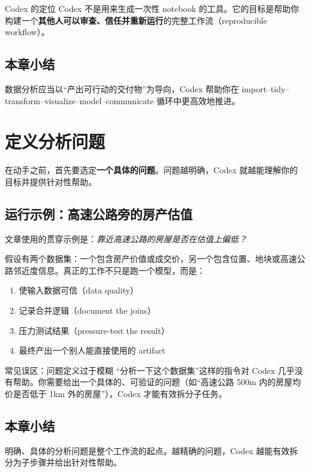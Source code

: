 \documentclass[a4paper]{article}
\begin{document}
\begin{importantbox}{Codex 的定位}
Codex 不是用来生成一次性 notebook 的工具。它的目标是帮助你构建一个\textbf{其他人可以审查、信任并重新运行}的完整工作流（reproducible workflow）。
\end{importantbox}

\subsection{本章小结}
数据分析应当以``产出可行动的交付物''为导向，Codex 帮助你在 import--tidy--transform--visualize--model--communicate 循环中更高效地推进。

\section{定义分析问题}

在动手之前，首先要选定\textbf{一个具体的问题}。问题越明确，Codex 就越能理解你的目标并提供针对性帮助。

\subsection{运行示例：高速公路旁的房产估值}

文章使用的贯穿示例是：\textit{靠近高速公路的房屋是否在估值上偏低？}

假设有两个数据集：一个包含房产价值或成交价，另一个包含位置、地块或高速公路邻近度信息。真正的工作不只是跑一个模型，而是：

\begin{enumerate}[nosep]
    \item 使输入数据可信（data quality）
    \item 记录合并逻辑（document the joins）
    \item 压力测试结果（pressure-test the result）
    \item 最终产出一个别人能直接使用的 artifact
\end{enumerate}

\begin{warningbox}{常见误区：问题定义过于模糊}
``分析一下这个数据集''这样的指令对 Codex 几乎没有帮助。你需要给出一个具体的、可验证的问题（如``高速公路 500m 内的房屋均价是否低于 1km 外的房屋''），Codex 才能有效拆分子任务。
\end{warningbox}

\subsection{本章小结}
明确、具体的分析问题是整个工作流的起点。越精确的问题，Codex 越能有效拆分为子步骤并给出针对性帮助。
\end{document}
